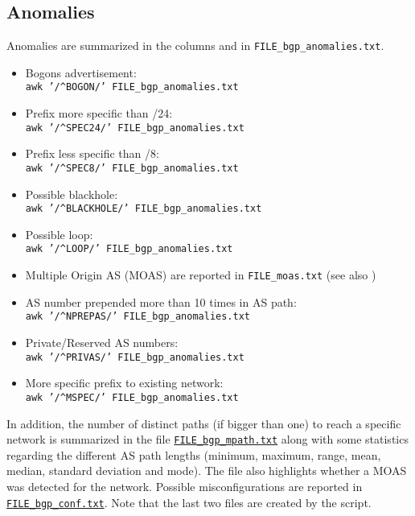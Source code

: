 \documentclass[documentation]{subfiles}
\begin{document}
\subsection{Anomalies}
Anomalies are summarized in the {\tt{}} columns and in {\tt FILE\_bgp\_anomalies.txt}.
\begin{itemize}
    \item Bogons advertisement:\\
        {\tt awk '/\textasciicircum{}BOGON/' FILE\_bgp\_anomalies.txt}
    \item Prefix more specific than /24:\\
        {\tt awk '/\textasciicircum{}SPEC24/' FILE\_bgp\_anomalies.txt}
    \item Prefix less specific than /8:\\
        {\tt awk '/\textasciicircum{}SPEC8/' FILE\_bgp\_anomalies.txt}
    \item Possible blackhole:\\
        {\tt awk '/\textasciicircum{}BLACKHOLE/' FILE\_bgp\_anomalies.txt}
    \item Possible loop:\\
        {\tt awk '/\textasciicircum{}LOOP/' FILE\_bgp\_anomalies.txt}
    \item Multiple Origin AS (MOAS) are reported in {\tt FILE\_moas.txt} (see also {\tt{}})
    \item AS number prepended more than 10 times in AS path:\\
        {\tt awk '/\textasciicircum{}NPREPAS/' FILE\_bgp\_anomalies.txt}
    \item Private/Reserved AS numbers:\\
        {\tt awk '/\textasciicircum{}PRIVAS/' FILE\_bgp\_anomalies.txt}
    \item More specific prefix to existing network:\\
        {\tt awk '/\textasciicircum{}MSPEC/' FILE\_bgp\_anomalies.txt}
\end{itemize}
In addition, the number of distinct paths (if bigger than one) to reach a specific network is summarized in the file {\tt\hyperref[bgpR]{FILE\_bgp\_mpath.txt}} along with some statistics regarding the different AS path lengths (minimum, maximum, range, mean, median, standard deviation and mode). The file also highlights whether a MOAS was detected for the network. Possible misconfigurations are reported in {\tt\hyperref[bgpR]{FILE\_bgp\_conf.txt}}. Note that the last two files are created by the {\tt{}} script.
\end{document}
